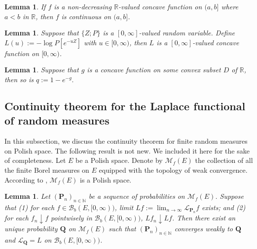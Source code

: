 \documentclass[12pt,a4paper]{amsart}
\numberwithin{equation}{section}
\theoremstyle{plain}
\newtheorem{lem}[thm]{Lemma}
\theoremstyle{definition}
\theoremstyle{remark}
\begin{document}
\begin{lem} \label{Fact:CR!}
	If $f$ is a non-decreasing $\mathbb R$-valued concave function on $(a,b]$ where $a<b$ in $\mathbb R$, then $f$ is continuous on $(a,b]$.
\end{lem}


\begin{lem} \label{Fact:CP!}
	Suppose that $\{Z; P\}$ is a $[0,\infty]$-valued random variable.
	Define $L(u):= - \log P[e^{- u Z}]$ with $u \in [0,\infty)$, then $L$ is a $[0,\infty]$-valued concave function on $[0,\infty)$.
\end{lem}

\begin{lem} \label{lem:CE}
	Suppose that $g$ is a concave function on some convex subset $D$ of $\mathbb R$, then so is $q:= 1- e^{-g}.$
\end{lem}

\subsection{Continuity theorem for the Laplace functional of random measures}
	In this subsection, we discuss the continuity theorem for finite random measures on Polish space.	
	The following result is not new.
	We included it here for the sake of completeness.
	Let $E$ be a Polish space.
	Denote by $\mathcal M_f(E)$ the collection of all the finite Borel measures on $E$ equipped with the topology of weak convergence.
	According to \cite[Lemma 4.5]{Kallenberg2017Random}, $\mathcal M_f(E)$ is a Polish space.
\begin{lem} \label{fact:WC}
	Let $(\mathbf P_n)_{n\in \mathbb N}$ be a sequence of probabilities on $\mathcal M_f(E)$.
	Suppose that
	(1) for each $f \in \mathcal B_b(E,[0,\infty))$, limit $Lf := \lim_{n\to \infty}\mathscr L_{\mathbf P_n}f$ exists; and
	(2) for each $f_n \downarrow f$ pointwisely in $\mathcal B_b(E,[0,\infty))$, $Lf_n \downarrow Lf$.
	Then there exist an unique probability $\mathbf Q$ on $\mathcal M_f(E)$
	such that $(\mathbf P_n)_{n \in \mathbb N}$ converges weakly
to $\mathbf Q$ and  $\mathscr L_\mathbf Q = L$ on $\mathcal B_b(E, [0,\infty))$.
\end{lem}
\end{document}
